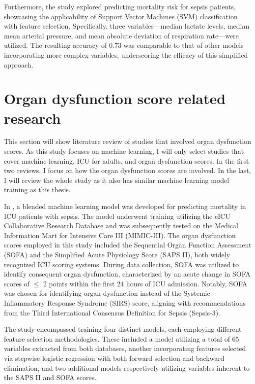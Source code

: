 \documentclass[12pt,a4paper,english
]{tunithesis}
\begin{document}
Furthermore, the study explored predicting mortality risk for sepsis patients, showcasing the applicability of Support Vector Machines (SVM) classification with feature selection. Specifically, three variables—median lactate levels, median mean arterial pressure, and mean absolute deviation of respiration rate—were utilized. The resulting accuracy of 0.73 was comparable to that of other models incorporating more complex variables, underscoring the efficacy of this simplified approach.

 

\section{Organ dysfunction score related research}
This section will show literature review of studies that involved organ dysfunction scores. As this study focuses on machine learning, I will only select studies that cover machine learning, ICU for adults, and organ dysfunction scores. In the first two reviews, I focus on how the organ dysfunction scores are involved. In the last, I will review the whole study as it also has similar machine learning model training as this thesis.

In \textcite{zeng2021}, a blended machine learning model was developed for predicting mortality in ICU patients with sepsis. The model underwent training utilizing the eICU Collaborative Research Database and was subsequently tested on the Medical Information Mart for Intensive Care III (MIMIC-III). The organ dysfunction scores employed in this study included the Sequential Organ Function Assessment (SOFA) and the Simplified Acute Physiology Score (SAPS II), both widely recognized ICU scoring systems. During data collection, SOFA was utilized to identify consequent organ dysfunction, characterized by an acute change in SOFA scores of $\leq$ 2 points within the first 24 hours of ICU admission. Notably, SOFA was chosen for identifying organ dysfunction instead of the Systemic Inflammatory Response Syndrome (SIRS) score, aligning with recommendations from the Third International Consensus Definition for Sepsis (Sepsis-3).

The study encompassed training four distinct models, each employing different feature selection methodologies. These included a model utilizing a total of 65 variables extracted from both databases, another incorporating features selected via stepwise logistic regression with both forward selection and backward elimination, and two additional models respectively utilizing variables inherent to the SAPS II and SOFA scores.
\end{document}
